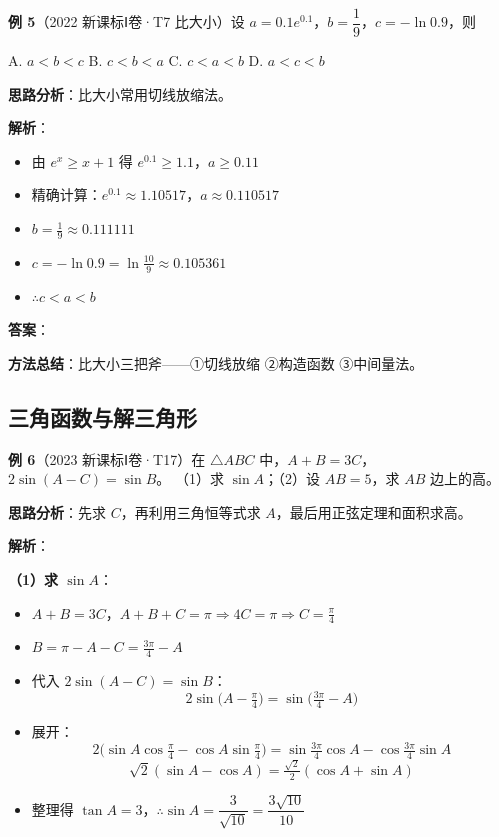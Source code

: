 \textbf{例 5}（2022 新课标Ⅰ卷·T7 比大小）设 $a = 0.1e^{0.1}$，$b = \dfrac{1}{9}$，$c = -\ln 0.9$，则

A. $a < b < c$ \quad B. $c < b < a$ \quad C. $c < a < b$ \quad D. $a < c < b$

\textbf{思路分析}：比大小常用切线放缩法。

\textbf{解析}：
\begin{itemize}
  \item 由 $e^x \ge x+1$ 得 $e^{0.1} \ge 1.1$，$a \ge 0.11$
  \item 精确计算：$e^{0.1} \approx 1.10517$，$a \approx 0.110517$
  \item $b = \frac{1}{9} \approx 0.111111$
  \item $c = -\ln 0.9 = \ln\frac{10}{9} \approx 0.105361$
  \item $\therefore c < a < b$
\end{itemize}

\textbf{答案}：

\textbf{方法总结}：比大小三把斧——①切线放缩 ②构造函数 ③中间量法。

\subsection{三角函数与解三角形}

\textbf{例 6}（2023 新课标Ⅰ卷·T17）在 $\triangle ABC$ 中，$A+B=3C$，$2\sin(A-C)=\sin B$。
（1）求 $\sin A$；（2）设 $AB=5$，求 $AB$ 边上的高。

\textbf{思路分析}：先求 $C$，再利用三角恒等式求 $A$，最后用正弦定理和面积求高。

\textbf{解析}：

\textbf{（1）求 $\sin A$}：
\begin{itemize}
  \item $A+B=3C$，$A+B+C=\pi \Rightarrow 4C=\pi \Rightarrow C=\frac{\pi}{4}$
  \item $B = \pi - A - C = \frac{3\pi}{4} - A$
  \item 代入 $2\sin(A-C)=\sin B$：
    \[
    2\sin\!\big(A-\tfrac{\pi}{4}\big) = \sin\!\big(\tfrac{3\pi}{4}-A\big)
    \]
  \item 展开：
    \[
    2\big(\sin A\cos\tfrac{\pi}{4} - \cos A\sin\tfrac{\pi}{4}\big) = \sin\tfrac{3\pi}{4}\cos A - \cos\tfrac{3\pi}{4}\sin A
    \]
    \[
    \sqrt{2}(\sin A - \cos A) = \tfrac{\sqrt{2}}{2}(\cos A + \sin A)
    \]
  \item 整理得 $\tan A = 3$，$\therefore \sin A = \dfrac{3}{\sqrt{10}} = \dfrac{3\sqrt{10}}{10}$
\end{itemize}


